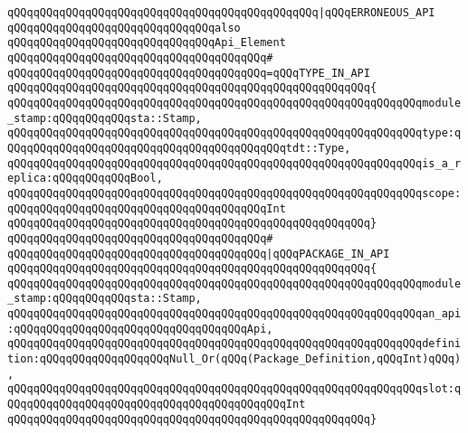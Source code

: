 \verb|qQQqqQQqqQQqqQQqqQQqqQQqqQQqqQQqqQQqqQQqqQQqqQQq|\verb#|qQQqERRONEOUS_API#\newline
\newline
\newline
\verb|qQQqqQQqqQQqqQQqqQQqqQQqqQQqqQQqalso|\newline
\verb|qQQqqQQqqQQqqQQqqQQqqQQqqQQqqQQqApi_Element|\newline
\verb|qQQqqQQqqQQqqQQqqQQqqQQqqQQqqQQqqQQqqQQq#|\newline
\verb|qQQqqQQqqQQqqQQqqQQqqQQqqQQqqQQqqQQqqQQq=qQQqTYPE_IN_API|\newline
\verb|qQQqqQQqqQQqqQQqqQQqqQQqqQQqqQQqqQQqqQQqqQQqqQQqqQQqqQQq{|\newline
\verb|qQQqqQQqqQQqqQQqqQQqqQQqqQQqqQQqqQQqqQQqqQQqqQQqqQQqqQQqqQQqqQQqmodule_stamp:qQQqqQQqqQQqsta::Stamp,|\newline
\verb|qQQqqQQqqQQqqQQqqQQqqQQqqQQqqQQqqQQqqQQqqQQqqQQqqQQqqQQqqQQqqQQqtype:qQQqqQQqqQQqqQQqqQQqqQQqqQQqqQQqqQQqqQQqqQQqtdt::Type,|\newline
\verb|qQQqqQQqqQQqqQQqqQQqqQQqqQQqqQQqqQQqqQQqqQQqqQQqqQQqqQQqqQQqqQQqis_a_replica:qQQqqQQqqQQqBool,|\newline
\verb|qQQqqQQqqQQqqQQqqQQqqQQqqQQqqQQqqQQqqQQqqQQqqQQqqQQqqQQqqQQqqQQqscope:qQQqqQQqqQQqqQQqqQQqqQQqqQQqqQQqqQQqqQQqInt|\newline
\verb|qQQqqQQqqQQqqQQqqQQqqQQqqQQqqQQqqQQqqQQqqQQqqQQqqQQqqQQq}|\newline
\verb|qQQqqQQqqQQqqQQqqQQqqQQqqQQqqQQqqQQqqQQq#|\newline
\verb|qQQqqQQqqQQqqQQqqQQqqQQqqQQqqQQqqQQqqQQq|\verb#|qQQqPACKAGE_IN_API#\newline
\verb|qQQqqQQqqQQqqQQqqQQqqQQqqQQqqQQqqQQqqQQqqQQqqQQqqQQqqQQq{|\newline
\verb|qQQqqQQqqQQqqQQqqQQqqQQqqQQqqQQqqQQqqQQqqQQqqQQqqQQqqQQqqQQqqQQqmodule_stamp:qQQqqQQqqQQqsta::Stamp,|\newline
\verb|qQQqqQQqqQQqqQQqqQQqqQQqqQQqqQQqqQQqqQQqqQQqqQQqqQQqqQQqqQQqqQQqan_api:qQQqqQQqqQQqqQQqqQQqqQQqqQQqqQQqqQQqApi,|\newline
\verb|qQQqqQQqqQQqqQQqqQQqqQQqqQQqqQQqqQQqqQQqqQQqqQQqqQQqqQQqqQQqqQQqdefinition:qQQqqQQqqQQqqQQqqQQqNull_Or(qQQq(Package_Definition,qQQqInt)qQQq),|\newline
\verb|qQQqqQQqqQQqqQQqqQQqqQQqqQQqqQQqqQQqqQQqqQQqqQQqqQQqqQQqqQQqqQQqslot:qQQqqQQqqQQqqQQqqQQqqQQqqQQqqQQqqQQqqQQqqQQqInt|\newline
\verb|qQQqqQQqqQQqqQQqqQQqqQQqqQQqqQQqqQQqqQQqqQQqqQQqqQQqqQQq}|\newline
